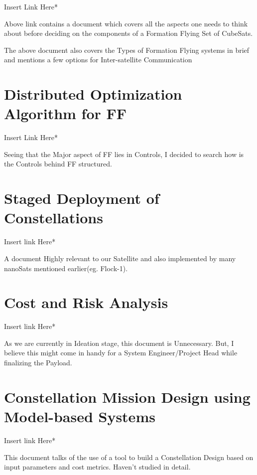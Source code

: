 \documentclass[12pt, a4paper, oneside]{book}
\begin{document}
\vspace{0cm}

Insert Link Here*

\vspace{0.3cm}

Above link contains a document which covers all the aspects one needs to think about before deciding on the components of a Formation Flying Set of CubeSats.

\vspace{0cm}

The above document also covers the Types of Formation Flying systems in brief and mentions a few options for Inter-satellite Communication

\section{Distributed Optimization Algorithm for FF}

\vspace{0cm}

Insert Link Here*

\vspace{0.3cm}

Seeing that the Major aspect of FF lies in Controls, I decided to search how is the Controls behind FF structured.

\section{Staged Deployment of Constellations}

\vspace{0cm}

Insert link Here*

\vspace{0.3cm}

A document Highly relevant to our Satellite and also implemented by many nanoSats mentioned earlier(eg. Flock-1). 

\section{Cost and Risk Analysis}

\vspace{0cm}

Insert link Here*

\vspace{0.3cm}

As we are currently in Ideation stage, this document is Unnecessary. But, I believe this might come in handy for a System Engineer/Project Head while finalizing the Payload.


\section{Constellation Mission Design using Model-based Systems}

\vspace{0cm}

Insert link Here*

\vspace{0.3cm}

This document talks of the use of a tool to build a Constellation Design based on input parameters and cost metrics. Haven't studied in detail.
\end{document}
